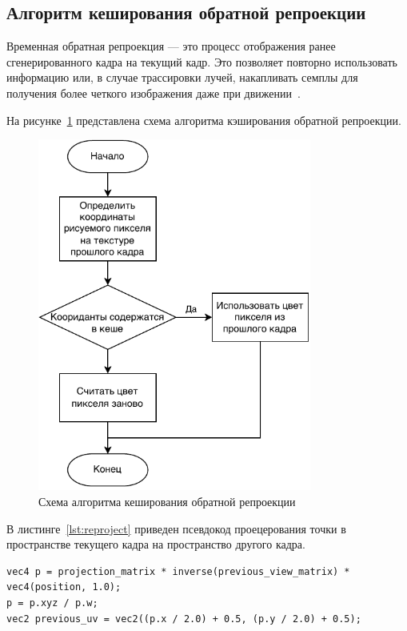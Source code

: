 \subsection{Алгоритм кеширования обратной репроекции}

Временная обратная репроекция --- это процесс отображения ранее сгенерированного кадра на 
текущий кадр. Это позволяет повторно использовать информацию или, в случае трассировки 
лучей, накапливать семплы для получения более четкого изображения даже при 
движении~\cite{ARTSwRPC}.

На рисунке~\ref{img:rrc} представлена схема алгоритма кэширования обратной
репроекции.

\begin{figure}[H]
	\centering
	\includegraphics[width=90mm]{inc/pdf/rrc}
	\caption{Схема алгоритма кеширования обратной репроекции}
	\label{img:rrc}
\end{figure}

В листинге~\ref{lst:reproject} приведен псевдокод проецерования точки в пространстве 
текущего кадра на пространство другого кадра.

\begin{lstlisting}[caption={Проецирование одного кадра на другой},label={lst:reproject},frame=single]
vec4 p = projection_matrix * inverse(previous_view_matrix) * vec4(position, 1.0);
p = p.xyz / p.w;
vec2 previous_uv = vec2((p.x / 2.0) + 0.5, (p.y / 2.0) + 0.5);
\end{lstlisting}

